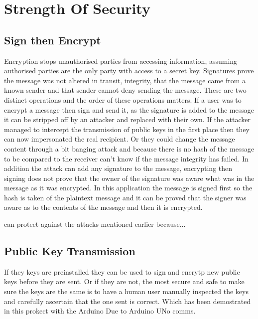 
\chapter{Strength Of Security}
\label{stre}




\section{Sign then Encrypt}

Encryption stops unauthorised parties from accessing information, assuming authorised parties are the only party with access to a secret key. Signatures prove the message was not altered in transit, integrity, that the message came from a known sender and that sender cannot deny sending the message. These are two distinct operations and the order of these operations matters. If a user was to encrypt a message then sign and send it, as the signature is added to the message it can be stripped off by an attacker and replaced with their own. If the attacker managed to intercept the transmission of public keys in the first place then they can now impersonated the real recipient. Or they could change the message content through a bit banging attack and because there is no hash of the message to be compared to the receiver can't know if the message integrity has failed. In addition the attack can add any signature to the message, encrypting then signing does not prove that the owner of the signature was aware what was in the message as it was encrypted. In this application the message is signed first so the hash is taken of the plaintext message and it can be proved that the signer was aware as to the contents of the message and then it is encrypted.

can protect against the attacks mentioned earlier because...


\section{Public Key Transmission}

If they keys are preinstalled they can be used to sign and encrytp new public keys before they are sent. Or if they are not, the most secure and safe to make sure the keys are the same is to have a human user manually inspected the keys and carefully ascertain that the one sent is correct. Which has been demostrated in this prokect with the Arduino Due to Arduino UNo comms.



